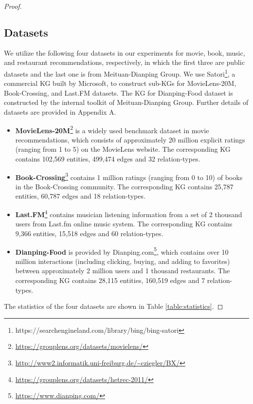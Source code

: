 \documentclass[sigconf]{acmart}
\begin{document}
\begin{proof}
	\subsection{Datasets}
		We utilize the following four datasets in our experiments for movie, book, music, and restaurant recommendations, respectively, in which the first three are public datasets and the last one is from Meituan-Dianping Group.
		We use Satori\footnote{https://searchengineland.com/library/bing/bing-satori}, a commercial KG built by Microsoft, to construct sub-KGs for MovieLens-20M, Book-Crossing, and Last.FM datasets.
		The KG for Dianping-Food dataset is constructed by the internal toolkit of Meituan-Dianping Group.
		Further details of datasets are provided in Appendix A.
		\begin{itemize}
			\item \textbf{MovieLens-20M}\footnote{\url{https://grouplens.org/datasets/movielens/}} is a widely used benchmark dataset in movie recommendations, which consists of approximately 20 million explicit ratings (ranging from 1 to 5) on the MovieLens website. The corresponding KG contains 102,569 entities, 499,474 edges and 32 relation-types.
			\item \textbf{Book-Crossing}\footnote{\url{http://www2.informatik.uni-freiburg.de/~cziegler/BX/}} contains 1 million ratings (ranging from 0 to 10) of books in the Book-Crossing community.  The corresponding KG contains 25,787 entities, 60,787 edges and 18 relation-types.
			\item \textbf{Last.FM}\footnote{\url{https://grouplens.org/datasets/hetrec-2011/}} contains musician listening information from a set of 2 thousand users from Last.fm online music system.  The corresponding KG contains 9,366 entities, 15,518 edges and 60 relation-types.
			\item \textbf{Dianping-Food} is provided by Dianping.com\footnote{\url{https://www.dianping.com/}}, which contains over 10 million interactions (including clicking, buying, and adding to favorites) between approximately 2 million users and 1 thousand restaurants. The corresponding KG contains 28,115 entities, 160,519 edges and 7 relation-types.
		\end{itemize}
		
		The statistics of the four datasets are shown in Table \ref{table:statistics}.
		

\end{proof}
\end{document}
